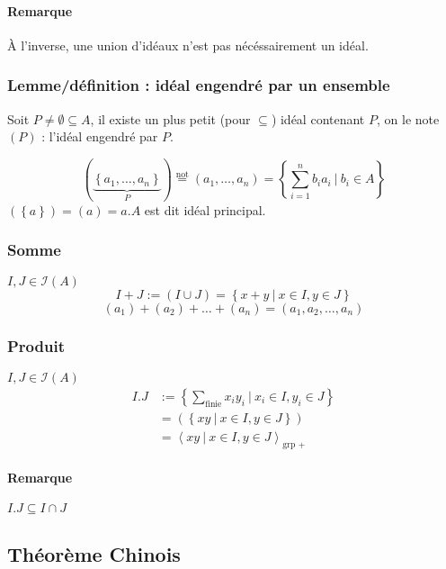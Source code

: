 \documentclass[reqno,a4paper,10pt]{report}
\newcommand{\gen}[1]{\left\langle #1 \right\rangle} %
\newcommand{\set}[1]{\left\lbrace #1 \right\rbrace} %
\newcommand{\underb}[2]{\underset{#1}{\underbrace{#2}}}
\newcommand{\Such}{\ \Big| \ }
\newcommand{\such}{\ | \ }
\newcommand{\tnot}[1]{\overset{\text{not}}{ #1 }}
\begin{document}
\paragraph{Remarque}
À l'inverse, une union d'idéaux n'est pas nécéssairement un idéal.

\subsubsection{Lemme/définition : idéal engendré par un ensemble}
Soit $P\neq \emptyset \subseteq A$, il existe un plus petit (pour $\subseteq$)
idéal contenant $P$, on le note $(P)$ : l'idéal engendré par $P$.
\begin{comment}
  Preuve 22/10/09 p2
\end{comment}

\[(\underb{P}{\set{a_1, \dots, a_n}})\tnot{=}(a_1, \dots, a_n) =
\set{\sum_{i=1}^n b_i a_i \Such b_i \in A}\]
$(\set{a}) = (a) = a. A$ est dit idéal principal.

\subsubsection{Somme}
$I, J \in \mathcal I (A)$
\[I+J:=(I\cup J)=\set{x+y \Such x \in I, y \in J}\]
\[(a_1)+(a_2)+\dots+(a_n) = (a_1, a_2, \dots, a_n)\]

\subsubsection{Produit}
$I,J \in \mathcal{I}(A)$
\begin{align*}
  I.J&:=\set{\sum_{\text{finie}}x_i y_i \Such x_i \in I, y_i \in J}\\
  &=\left( \set{xy \such x\in I, y\in J} \right)\\
  &=\gen{xy \such x\in I, y\in J}_{\text{grp }+}
\end{align*}

\paragraph{Remarque} $I.J \subseteq I\cap J$

\subsection{Théorème Chinois}
\end{document}
